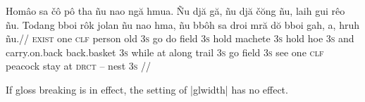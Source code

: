 \ex
\hsize=2.5in
\let\\=\textsc
\begingl[glhangstyle=none]
\gla Hom\^{a}o sa \v{c}\^{o} p\^{o} tha  \~{n}u nao ng\u{a}
hmua. \~{N}u dj\u{a} g\u{a}, \~{n}u dj\u{a} \v{c}\u{o}ng \~{n}u,
laih gui r\^{e}o \~{n}u. Todang bboi r\^{o}k jolan \~{n}u nao
hma, \~{n}u bb\^{o}h sa droi mr\u{a} d\u{o} bboi gah, a, hruh
\~{n}u.//
\glb \\{exist} one \\{clf} person old \\{3s} go do field
\\{3s} hold machete \\{3s} hold hoe \\{3s} and carry.on.back
back.basket \\{3s} while at along trail \\{3s} go field \\{3s}
see one \\{clf} peacock stay at \\{drct} -- nest \\{3s}
//
\endgl
\xe


If gloss breaking is in effect, the setting of |glwidth| has no
effect.



